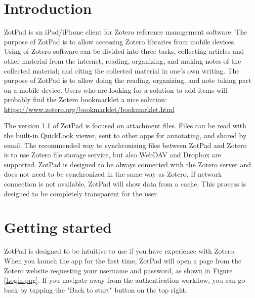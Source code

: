 \documentclass[oneside, openany, 12pt]{tufte-book}
\newcommand{\iphone}[1]{#1}
\newcommand{\ipadfootnote}[1]{}
\newcommand{\iphone}[1]{}
\newcommand{\ipadfootnote}[1]{\footnote{#1}}
\begin{document}
\maketitle


\chapter{Introduction}




ZotPad is an iPad/iPhone client for Zotero reference management software. The purpose of ZotPad is to allow accessing Zotero libraries from mobile devices. Using of Zotero software can be divided into three tasks, collecting articles and other material from the internet; reading, organizing, and making notes of the collected material; and citing the collected material in one's own writing. The purpose of ZotPad is to allow doing the reading, organizing, and note taking part on a mobile device\ipadfootnote{During the summer 2012 Zotero developers announced a Zotero bookmarklet that can be used to add items directly from mobile safari. More information about the bookmarklet can be found on the Zotero website at\url{https://www.zotero.org/bookmarklet/bookmarklet.html}}. \iphone{Users who are looking for a solution to add items will probably find the Zotero bookmarklet a nice solution: \url{https://www.zotero.org/bookmarklet/bookmarklet.html}}

The version 1.1 of ZotPad is focused on attachment files. Files can be read with the built-in QuickLook viewer, sent to other apps for annotating, and shared by email. The recommended way to synchronizing files between ZotPad and Zotero is to use Zotero file storage service, but also WebDAV and Dropbox are supported. ZotPad is designed to be always connected with the Zotero server and does not need to be synchronized in the same way as Zotero. If network connection is not available, ZotPad will show data from a cache. This process is designed to be completely transparent for the user.

\chapter{Getting started}

ZotPad is designed to be intuitive to use if you have experience with Zotero. When you launch the app for the first time, ZotPad will open a page from the Zotero website requesting your username and password, as shown in Figure \ref{Login.png}. If you navigate away from the authentication workflow, you can go back by tapping the "Back to start" button on the top right.
\end{document}
